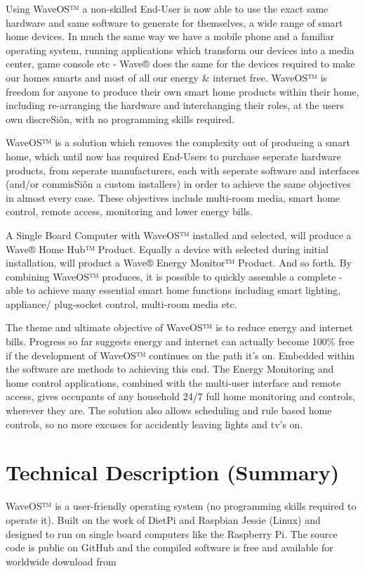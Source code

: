 \documentclass[letterpaper,10pt,english]{sphinxmanual}
\begin{document}
Using WaveOS™ a non-skilled End-User is now able to use the exact same hardware and same software to generate for themselves, a wide range of smart home devices. In much the same way we have a mobile phone and a familiar operating system, running applications which transform our devices into a media center, game console etc - Wave® does the same for the devices required to make our homes smarts and most of all our energy \& internet free. WaveOS™ is freedom for anyone to produce their own smart home products within their home, including re-arranging the hardware and interchanging their roles, at the users own discreSiôn, with no programming skills required.

WaveOS™ is a solution which removes the complexity out of producing a smart home, which until now has required End-Users to purchase seperate hardware products, from seperate manufacturers, each with seperate software and interfaces (and/or commisSiôn a custom installers) in order to achieve the same objectives in almost every case. These objectives include multi-room media, smart home control, remote access, monitoring and lower energy bills.

A Single Board Computer with WaveOS™ installed and  selected, will produce a Wave® Home Hub™ Product. Equally a device with  selected during initial installation, will product a Wave® Energy Monitor™ Product. And so forth. By combining  WaveOS™ produces, it is possible to quickly assemble a complete  - able to achieve many essential smart home functions including smart lighting, appliance/ plug-socket control, multi-room media etc.

The theme and ultimate objective of WaveOS™ is to reduce energy and internet bills. Progress so far suggests energy and internet can actually become 100\% free if the development of WaveOS™ continues on the path it’s on. Embedded within the software are methods to achieving this end. The Energy Monitoring and home control applications, combined with the multi-user interface and remote access, gives occupants of any household 24/7 full home monitoring and controls, wherever they are. The solution also allows scheduling and rule based home controls, so no more excuses for accidently leaving lights and tv’s on.


\section{Technical Description (Summary)}
\label{\detokenize{appendix-a:technical-description-summary}}
WaveOS™ is a user-friendly operating system (no programming skills required to operate it). Built on the work of DietPi and Raspbian Jessie (Linux) and designed to run on single board computers  like the Raspberry Pi. The source code is public on GitHub and the compiled software is free and available for worldwide download from 
\end{document}
